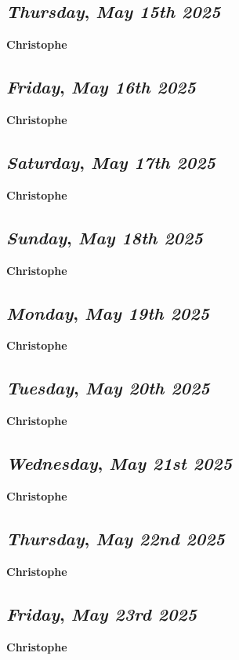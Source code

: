 \def\day{\textit{May 15th 2025}}
\def\weekday{\textit{Thursday}}
\subsection*{\weekday, \day}
\textbf {Christophe}

\def\day{\textit{May 16th 2025}}
\def\weekday{\textit{Friday}}
\subsection*{\weekday, \day}
\textbf {Christophe}

\def\day{\textit{May 17th 2025}}
\def\weekday{\textit{Saturday}}
\subsection*{\weekday, \day}
\textbf {Christophe}

\def\day{\textit{May 18th 2025}}
\def\weekday{\textit{Sunday}}
\subsection*{\weekday, \day}
\textbf {Christophe}

\def\day{\textit{May 19th 2025}}
\def\weekday{\textit{Monday}}
\subsection*{\weekday, \day}
\textbf {Christophe}

\def\day{\textit{May 20th 2025}}
\def\weekday{\textit{Tuesday}}
\subsection*{\weekday, \day}
\textbf {Christophe}

\def\day{\textit{May 21st 2025}}
\def\weekday{\textit{Wednesday}}
\subsection*{\weekday, \day}
\textbf {Christophe}

\def\day{\textit{May 22nd 2025}}
\def\weekday{\textit{Thursday}}
\subsection*{\weekday, \day}
\textbf {Christophe}

\def\day{\textit{May 23rd 2025}}
\def\weekday{\textit{Friday}}
\subsection*{\weekday, \day}
\textbf {Christophe}

